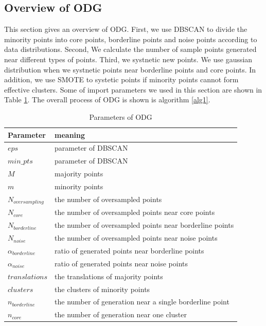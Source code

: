 \documentclass[ida]{iosart2x}
\begin{document}
\subsection{Overview of ODG}
This section gives an overview of ODG. 
First, we use DBSCAN to divide the minority points into core points, 
borderline points and noise points according 
to data distributions. 
Second, We calculate the number of sample points generated near different types of points.
Third, we systnetic new points.
We use gaussian distribution when we systnetic points near borderline points and core points.
In addition, we use SMOTE to systetic points if minority points cannot form effective clusters.
Some of import parameters we used in this section are shown in Table \ref{table15}.
The overall process of ODG is shown is algorithm \ref{alg1}.
\begin{table}[]
  \caption{Parameters of ODG}
  \label{table15}
  \begin{tabular}{ll}
  \hline
  Parameter             & meaning                                                 \\ \hline
  $eps$                 & parameter of DBSCAN                                     \\
  $min\_pts$            & parameter of DBSCAN                                     \\
  $M$                   & majority points                                         \\
  $m$                   & minority points                                         \\
  $N_{oversampling}$    & the number of oversampled points                        \\
  $N_{core}$            & the number of oversampled points near core points       \\
  $N_{borderline}$      & the number of oversampled points near borderline points \\
  $N_{noise}$           & the number of oversampled points near noise points      \\
  $\alpha_{borderline}$ & ratio of generated points near borderline points        \\
  $\alpha_{noise}$      & ratio of generated points near noise points             \\
  $translations$        & the translations of majority points                     \\
  $clusters$            & the clusters of minority points                         \\ 
  $n_{borderline}$      & the number of generation near a single borderline point \\ 
  $n_{core}$            & the number of generation near one cluster               \\ \hline
  \end{tabular}
  \end{table}
\end{document}
